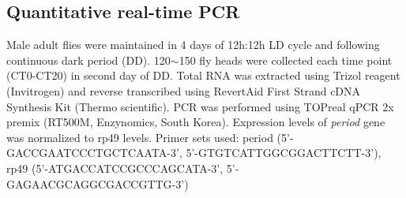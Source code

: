 \subsection*{Quantitative real-time PCR}

Male adult flies were maintained in 4 days of 12h:12h LD cycle and following continuous dark period (DD). 120$\sim$150 fly heads were collected each time point (CT0-CT20) in second day of DD.
Total RNA was extracted using Trizol reagent (Invitrogen) and reverse transcribed using RevertAid First Strand cDNA Synthesis Kit (Thermo scientific).
PCR was performed using TOPreal qPCR 2x premix (RT500M, Enzynomics, South Korea). Expression levels of \emph{period} gene was normalized to rp49 levels.
Primer sets used: period (5'-GACCGAATCCCTGCTCAATA-3', 5'-GTGTCATTGGCGGACTTCTT-3'), rp49 (5'-ATGACCATCCGCCCAGCATA-3', 5'-GAGAACGCAGGCGACCGTTG-3')
    
  
  
  
  